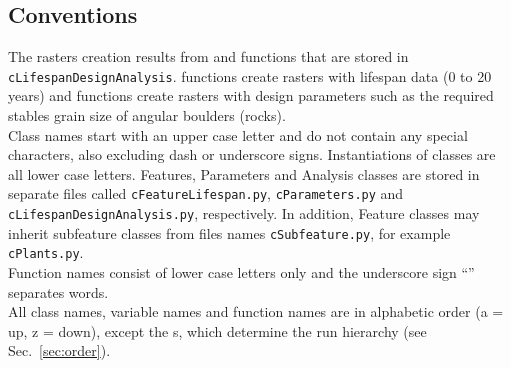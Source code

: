 \subsection{Conventions}
The rasters creation results from  and  functions that are stored in \texttt{cLifespanDesignAnalysis}.  functions create rasters with lifespan data (0 to 20 years) and  functions create rasters with design parameters such as the required stables grain size of angular boulders (rocks).\\
Class names start with an upper case letter and do not contain any special characters, also excluding dash or underscore signs. Instantiations of classes are all lower case letters. Features, Parameters and Analysis classes are stored in separate files called \texttt{cFeatureLifespan.py}, \texttt{cParameters.py} and \texttt{cLifespanDesignAnalysis.py}, respectively. In addition, Feature classes may inherit subfeature classes from files names \texttt{cSubfeature.py}, for example \texttt{cPlants.py}.\\
Function names consist of lower case letters only and the underscore sign ``{\myUnderscore}'' separates words.\\
All class names, variable names and function names are in alphabetic order (a = up, z = down), except the s, which determine the run hierarchy (see Sec.~\ref{sec:order}).

